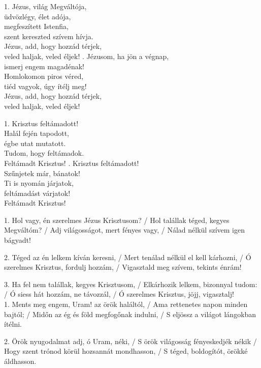 \documentclass[twoside]{article}
\begin{document}
\begin{hymnstanzas}
  1. Jézus, világ Megváltója,\\
  üdvözlégy, élet adója,\\
  megfeszített Istenfia,\\
  szent kereszted szívem hívja.\\
  Jézus, add, hogy hozzád térjek,\\
  veled haljak, veled éljek!
. Jézusom, ha jön a végnap,\\
  ismerj engem magadénak!\\
  Homlokomon piros véred,\\
  tiéd vagyok, úgy ítélj meg!\\
  Jézus, add, hogy hozzád térjek,\\
  veled haljak, veled éljek!
\end{hymnstanzas}

\begin{hymnstanzas}
  1. Krisztus feltámadott!\\
  Halál fején tapodott,\\
  égbe utat mutatott.\\
  Tudom, hogy feltámadok.\\
  Feltámadt Krisztus!
. Krisztus feltámadott!\\
  Szűnjetek már, bánatok!\\
  Ti is nyomán járjatok,\\
  feltámadást várjatok!\\
  Feltámadt Krisztus!
\end{hymnstanzas}

1. Hol vagy, én szerelmes Jézus Krisztusom? / Hol talállak téged, kegyes Megváltóm? / Adj világosságot, mert fényes vagy, / Nálad nélkül szívem igen bágyadt!

2. Téged az én lelkem kíván keresni, / Mert tenálad nélkül el kell kárhozni, / Ó szerelmes Krisztus, fordulj hozzám, / Vigasztald meg szívem, tekints énrám!

3. Ha fel nem talállak, kegyes Krisztusom, / Elkárhozik lelkem, bizonnyal tudom: / Ó siess hát hozzám, ne távozzál, / Ó szerelmes Krisztus, jöjj, vigasztalj!\\

1. Ments meg engem, Uram! az örök haláltól, / Ama rettenetes napon minden bajtól; / Midőn az ég és föld megfogőnak indulni, / S eljössz a világot lángokban ítélni.

2. Örök nyugodalmat adj, ó Uram, néki, / S örök világosság fényeskedjék nékik / Hogy szent trónod körül hozsannát mondhasson, / S téged, boldogítót, örökké áldhasson.
\end{document}
